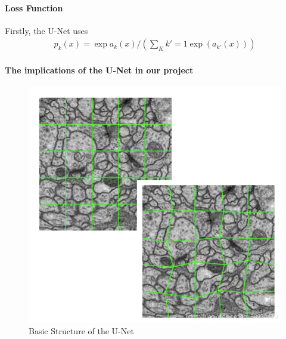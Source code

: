 \documentclass{article}
\begin{document}
\paragraph{Loss Function}
Firstly, the U-Net uses 
\begin{align*}
    p_k(x) = \exp{a_k(x)}/ \left(\sum_{K}{k'=1}\exp(a_{k'}(x))\right)
\end{align*}

\paragraph{The implications of the U-Net in our project}
\begin{figure}[htp]
    \centering
    \includegraphics[scale = 0.5]{Figures/Distortion.png}
   \caption{Basic Structure of the U-Net}
\end{figure}
\end{document}
